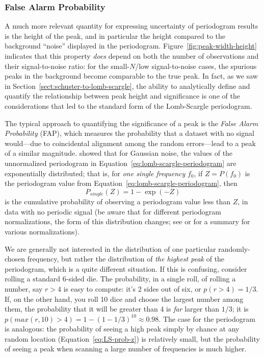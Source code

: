 \documentclass[preprint]{aastex}
\newcommand{\fig}[1]{Figure~\ref{fig:#1}}
\newcommand{\Eq}[1]{Equation~\ref{eq:#1}}
\newcommand{\eq}[1]{\Eq{#1}}
\newcommand{\eqlabel}[1]{\label{eq:#1}}
\newcommand{\Sect}[1]{Section~\ref{sect:#1}}
\newcommand{\sect}[1]{\Sect{#1}}
\begin{document}
\subsubsection{False Alarm Probability}
A much more relevant quantity for expressing uncertainty of periodogram results
is the height of the peak, and in particular the height compared to the
background ``noise'' displayed in the periodogram.
\fig{peak-width-height} indicates that this property {\it does} depend on
both the number of observations and their signal-to-noise ratio: for the
small-$N$/low signal-to-noise cases, the spurious peaks in the background
become comparable to the true peak.
In fact, as we saw in \sect{schuster-to-lomb-scargle}, the ability to
analytically define and quantify the relationship between peak height
and significance is one of the considerations that led to the standard
form of the Lomb-Scargle periodogram.

The typical approach to quantifying the significance of a peak is the {\it
False Alarm Probability} (FAP), which measures the probability that a dataset
with no signal would---due to coincidental alignment among the random
errors---lead to a peak of a similar magnitude.
\citet{Scargle82} showed that for Gaussian noise, the values of the unnormalized
periodogram in \eq{lomb-scargle-periodogram} are exponentially distributed;
that is, for {\it one single frequency} $f_0$, if $Z = P(f_0)$ is the
periodogram value from \eq{lomb-scargle-periodogram}, then
\begin{equation}
  P_{single}(Z) = 1 - \exp(-Z)
  \eqlabel{LS-prob-z}
\end{equation}
is the cumulative probability of observing a periodogram value less than $Z$,
in data with no periodic signal
(be aware that for different periodogram normalizations,
the form of this distribution changes; see \citet{Cumming99} or
\citet{Baluev2008} for a summary for various normalizations).


We are generally not interested in the distribution of one particular
randomly-chosen frequency,
but rather the distribution of {\it the highest peak} of the
periodogram, which is a quite different situation.
If this is confusing, consider rolling a standard 6-sided die.
The probability, in a single roll, of rolling a number, say $r > 4$ is easy
to compute: it's 2 sides out of six, or $p(r>4) = 1/3$.
If, on the other hand, you roll 10 dice and choose the largest number among
them, the probability that it will be greater than 4 is {\it far} larger
than $1/3$; it is $p(max(r,10) > 4) = 1 - (1 - 1/3)^{10} \approx 0.98$.
The case for the periodogram is analogous: the probability of seeing a high peak
simply by chance at any random location (\eq{LS-prob-z}) is relatively small,
but the probability of seeing a peak when scanning a large number of
frequencies is much higher.
\end{document}
